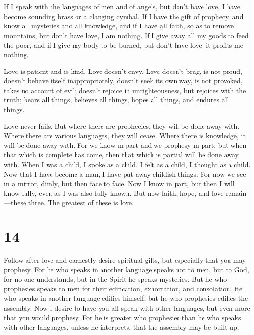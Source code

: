  If I speak with the languages of men and of angels, but
don't have love, I have become sounding brass or a clanging cymbal.
 If I have the gift of prophecy, and know all mysteries and
all knowledge, and if I have all faith, so as to remove mountains, but
don't have love, I am nothing.  If I give away all my goods
to feed the poor, and if I give my body to be burned, but don't have
love, it profits me nothing.

 Love is patient and is kind. Love doesn't envy. Love
doesn't brag, is not proud,  doesn't behave itself
inappropriately, doesn't seek its own way, is not provoked, takes no
account of evil;  doesn't rejoice in unrighteousness, but
rejoices with the truth;  bears all things, believes all
things, hopes all things, and endures all things.

 Love never fails. But where there are prophecies, they will
be done away with. Where there are various languages, they will cease.
Where there is knowledge, it will be done away with.  For we
know in part and we prophesy in part;  but when that which
is complete has come, then that which is partial will be done away with.
 When I was a child, I spoke as a child, I felt as a child,
I thought as a child. Now that I have become a man, I have put away
childish things.  For now we see in a mirror, dimly, but
then face to face. Now I know in part, but then I will know fully, even
as I was also fully known.  But now faith, hope, and love
remain---these three. The greatest of these is love.

\hypertarget{section-13}{%
\section{14}\label{section-13}}

 Follow after love and earnestly desire spiritual gifts, but
especially that you may prophesy.  For he who speaks in
another language speaks not to men, but to God, for no one understands,
but in the Spirit he speaks mysteries.  But he who
prophesies speaks to men for their edification, exhortation, and
consolation.  He who speaks in another language edifies
himself, but he who prophesies edifies the assembly.  Now I
desire to have you all speak with other languages, but even more that
you would prophesy. For he is greater who prophesies than he who speaks
with other languages, unless he interprets, that the assembly may be
built up.

